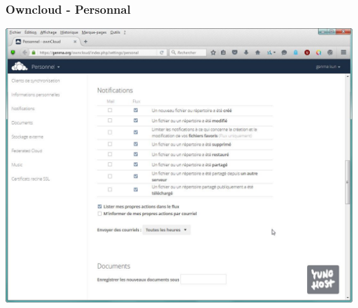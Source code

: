 \documentclass{beamer}
\begin{document}
\begin{frame}
\frametitle{Owncloud - Personnal}
\includegraphics[scale=0.4] {./Owncloud/Owncloud_Personnel.jpg}
\end{frame}
\end{document}
